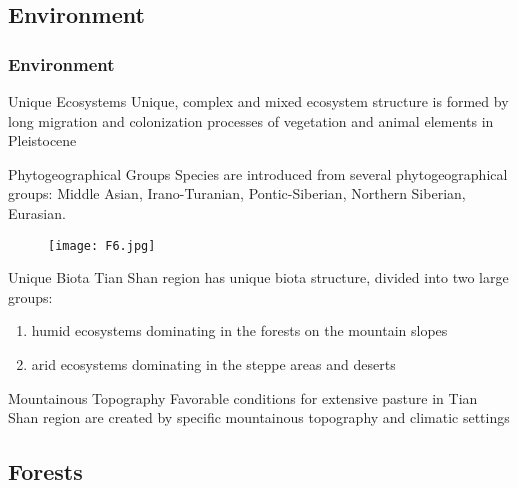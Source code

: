 \documentclass[pdflatex,compress,8pt,
	xcolor={dvipsnames,dvipsnames,svgnames,x11names,table},
	hyperref={colorlinks = true,
	breaklinks = true, 
	urlcolor = NavyBlue, 
	breaklinks = true}]{beamer}
\begin{document}
\subsection{Environment}
\begin{frame}\frametitle{Environment}
\footnotesize{
\begin{alertblock}{Unique Ecosystems}
Unique, complex and mixed ecosystem structure is formed by long migration and colonization processes of vegetation and animal elements in Pleistocene
\end{alertblock}

\begin{block}{Phytogeographical Groups}
Species are introduced from several phytogeographical groups: \alert{Middle Asian, Irano-Turanian, Pontic-Siberian, Northern Siberian, Eurasian}.
\end{block}

\begin{figure}[H]
	\centering
		\texttt{[image: F6.jpg]}
\end{figure}

\begin{block}{Unique Biota}
Tian Shan region has unique biota structure, divided into two large groups: 
\begin{enumerate}
	\item \alert{humid} ecosystems dominating in the forests on the mountain slopes
	\item \alert{arid} ecosystems dominating in the steppe areas and deserts
\end{enumerate}
\end{block}

\begin{examples}{Mountainous Topography}
Favorable conditions for extensive pasture in Tian Shan region are created by specific mountainous topography and climatic settings
\end{examples}
}
\end{frame}

\subsection{Forests}
\end{document}
